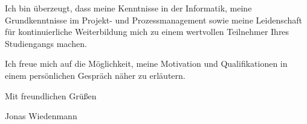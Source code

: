 \begin{cvparagraph}
    Ich bin überzeugt, dass meine Kenntnisse in der Informatik, meine Grundkenntnisse im Projekt- und Prozessmanagement sowie meine Leidenschaft für kontinuierliche Weiterbildung mich zu einem wertvollen Teilnehmer Ihres Studiengangs machen. 

    Ich freue mich auf die Möglichkeit, meine Motivation und Qualifikationen in einem persönlichen Gespräch näher zu erläutern.

    Mit freundlichen Grüßen

    \vspace{11pt}
    \vspace{11pt}
    \vspace{11pt}

    Jonas Wiedenmann
\end{cvparagraph}
\endgroup